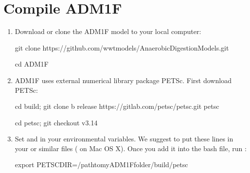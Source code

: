 \documentclass[a4paper,10pt,english]{sphinxmanual}
\begin{document}
\chapter{Compile ADM1F}
\label{\detokenize{compile:compile-adm1f}}\label{\detokenize{compile::doc}}\begin{enumerate}
%
\setcounter{enumi}{-1}
\item {} 
\sphinxAtStartPar
Download or clone the ADM1F model to your local computer:

\begin{sphinxVerbatim}[commandchars=\\\{\}]
\PYGZdl{} git clone https://github.com/wwtmodels/Anaerobic\PYGZhy{}Digestion\PYGZhy{}Models.git
\end{sphinxVerbatim}

\begin{sphinxVerbatim}[commandchars=\\\{\}]
\PYGZdl{} cd ADM1F
\end{sphinxVerbatim}

\item {} 
\sphinxAtStartPar
ADM1F uses external numerical library package PETSc. First download PETSc:

\begin{sphinxVerbatim}[commandchars=\\\{\}]
\PYGZdl{} cd build; git clone \PYGZhy{}b release https://gitlab.com/petsc/petsc.git petsc
\end{sphinxVerbatim}

\begin{sphinxVerbatim}[commandchars=\\\{\}]
\PYGZdl{} cd petsc; git checkout v3.14
\end{sphinxVerbatim}

\item {} 
\sphinxAtStartPar
Set  and  in your environmental variables. We suggest to put these lines in your  or similar files ( on Mac OS X). Once you add it into the bash file, run :

\begin{sphinxVerbatim}[commandchars=\\\{\}]
\PYGZdl{} export PETSC\PYGZus{}DIR=/path\PYGZhy{}to\PYGZhy{}my\PYGZhy{}ADM1F\PYGZhy{}folder/build/petsc
\end{sphinxVerbatim}


\end{enumerate}
\end{document}
